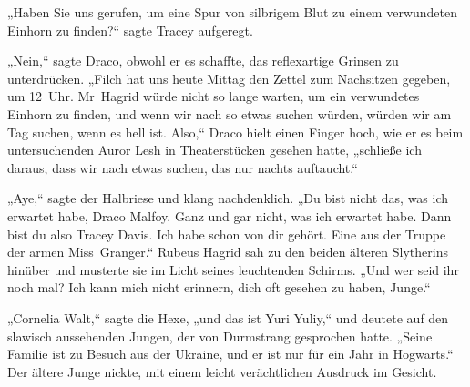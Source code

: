 „Haben Sie uns gerufen, um eine Spur von silbrigem Blut zu einem verwundeten Einhorn zu finden?“ sagte Tracey aufgeregt.

„Nein,“ sagte Draco, obwohl er es schaffte, das reflexartige Grinsen zu unterdrücken. „Filch hat uns heute Mittag den Zettel zum Nachsitzen gegeben, um 12~Uhr. Mr~Hagrid würde nicht so lange warten, um ein verwundetes Einhorn zu finden, und wenn wir nach so etwas suchen würden, würden wir am Tag suchen, wenn es hell ist. Also,“ Draco hielt einen Finger hoch, wie er es beim untersuchenden Auror Lesh in Theaterstücken gesehen hatte, „schließe ich daraus, dass wir nach etwas suchen, das nur nachts auftaucht.“

„Aye,“ sagte der Halbriese und klang nachdenklich. „Du bist nicht das, was ich erwartet habe, Draco Malfoy. Ganz und gar nicht, was ich erwartet habe. Dann bist du also Tracey Davis. Ich habe schon von dir gehört. Eine aus der Truppe der armen Miss~Granger.“ Rubeus Hagrid sah zu den beiden älteren Slytherins hinüber und musterte sie im Licht seines leuchtenden Schirms. „Und wer seid ihr noch mal? Ich kann mich nicht erinnern, dich oft gesehen zu haben, Junge.“

„Cornelia Walt,“ sagte die Hexe, „und das ist Yuri Yuliy,“ und deutete auf den slawisch aussehenden Jungen, der von Durmstrang gesprochen hatte. „Seine Familie ist zu Besuch aus der Ukraine, und er ist nur für ein Jahr in Hogwarts.“
Der ältere Junge nickte, mit einem leicht verächtlichen Ausdruck im Gesicht.

